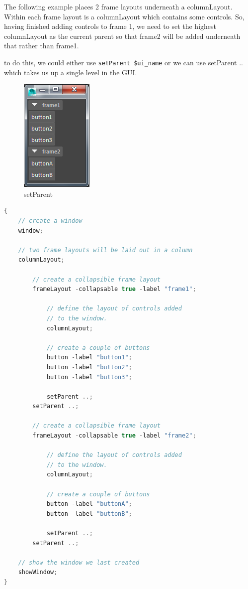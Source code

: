 The following example places 2 frame layouts underneath a columnLayout. Within each frame layout is a columnLayout which contains some controls. So, having finished adding controls to frame 1, we need to set the highest columnLayout as the current parent so that frame2 will be added underneath that rather than frame1.

to do this, we could either use \lstinline|setParent $ui_name| or we can use setParent .. which takes us up a single level in the GUI.

\begin{figure}[tbh]
	\centering
	\includegraphics[width=0.3\linewidth]{figures/GUI/setParent}
	\caption{setParent}
	\label{fig:setparent}
\end{figure}

\begin{lstlisting}[language=C++]
{		
	// create a window
	window;
	
	// two frame layouts will be laid out in a column
	columnLayout;
	
		// create a collapsible frame layout
		frameLayout -collapsable true -label "frame1";
		
			// define the layout of controls added 
			// to the window.
			columnLayout;
			
			// create a couple of buttons
			button -label "button1";
			button -label "button2";
			button -label "button3";
			
			setParent ..;
		setParent ..;
		
		// create a collapsible frame layout
		frameLayout -collapsable true -label "frame2";
		
			// define the layout of controls added 
			// to the window.
			columnLayout;
			
			// create a couple of buttons
			button -label "buttonA";
			button -label "buttonB";
			
			setParent ..;
		setParent ..;
	
	// show the window we last created
	showWindow;
}
\end{lstlisting}




